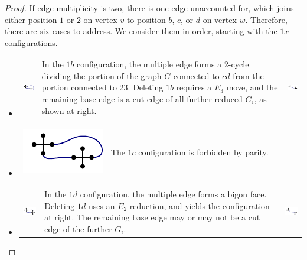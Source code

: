 \documentclass[amsmath,secnumarabic,floatfix,amssymb,nofootinbib,nobibnotes,letterpaper,11pt,tightenlines,showkeys]{revtex4}
\theoremstyle{definition}
\newcommand{\edgedouble}{E_2}
\newcommand{\cutedgedouble}{E_3}
\begin{document}
\begin{proof}
If edge multiplicity is two, there is one edge unaccounted for, which joins either position $1$ or $2$ on vertex $v$ to position $b$, $c$, or $d$ on vertex $w$. Therefore, there are six cases to address. We consider them in order, starting with the $1x$ configurations.
\begin{itemize}
\item
\begin{tabular}{m{1in}m{3in}m{1in}}
\includegraphics[width=0.9in]{1-b-configuration.pdf}
&
In the $1b$ configuration, the multiple edge forms a 2-cycle dividing the portion of the graph $G$ connected to $cd$ from the portion connected to $23$. Deleting $1b$ requires a $\cutedgedouble$ move, and the remaining base edge is a cut edge of all further-reduced $G_i$, as shown at right.
&
\includegraphics[width=0.9in]{1-b-target.pdf}
\end{tabular}
\item
\begin{tabular}{m{1in}m{3in}}
\includegraphics[width=.9in]{1-c-configuration.pdf}
&
The $1c$ configuration is forbidden by parity.
\end{tabular}
\item
\begin{tabular}{m{1in}m{3in}m{1in}}
\includegraphics[width=0.9in]{1-d-configuration.pdf}
&
In the $1d$ configuration, the multiple edge forms a bigon face. Deleting $1d$ uses an $\edgedouble$ reduction, and yields the configuration at right. The remaining base edge may or may not be a cut edge of the further $G_i$.
&
\includegraphics[width=0.9in]{1-d-target.pdf}
\end{tabular}

\end{itemize}
\end{proof}
\end{document}
